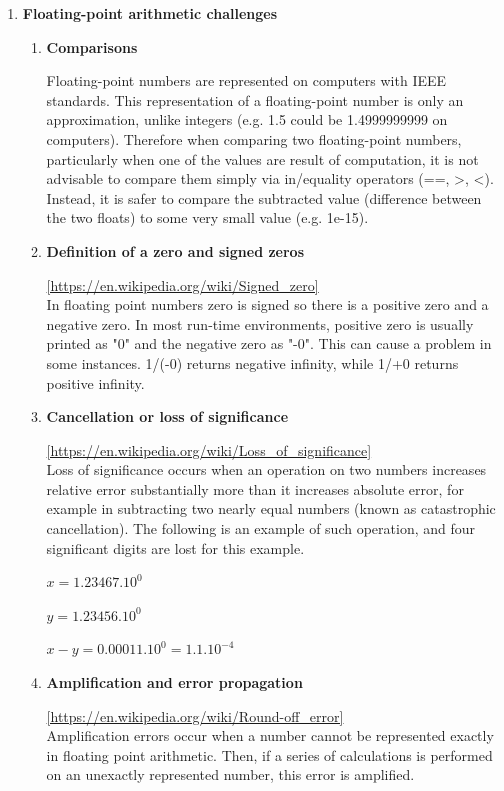 \documentclass[10pt, letterpaper, twoside]{article}
\begin{document}
\begin{titlepage}
\begin{enumerate}
\item \textbf{Floating-point arithmetic challenges} 

\begin{enumerate}

\item \textbf{Comparisons} 

Floating-point numbers are represented on computers with IEEE standards. This representation of a floating-point number is only an approximation, unlike integers (e.g. 1.5 could be 1.4999999999 on computers). Therefore when comparing two floating-point numbers, particularly when one of the values are result of computation, it is not advisable to compare them simply via in/equality operators (==, \textgreater , \textless ). Instead, it is safer to compare the subtracted value (difference between the two floats) to some very small value (e.g. 1e-15). \\

\item \textbf{Definition of a zero and signed zeros} 

\url{[https://en.wikipedia.org/wiki/Signed_zero]} \\
In floating point numbers zero is signed so there is a positive zero and a negative zero. In most run-time environments, positive zero is usually printed as "0" and the negative zero as "-0". This can cause a problem in some instances. 1/(-0) returns negative infinity, while 1/+0 returns positive infinity. \\

\item \textbf{Cancellation or loss of significance} 

\url{[https://en.wikipedia.org/wiki/Loss_of_significance]} \\
Loss of significance occurs when an operation on two numbers increases relative error substantially more than it increases absolute error, for example in subtracting two nearly equal numbers (known as catastrophic cancellation). The following is an example of such operation, and four significant digits are lost for this example. 

$x = 1.23467 . 10^0 $ 

$y = 1.23456 . 10^0 $  

$x - y = 0.00011 . 10^0 = 1.1 . 10^{-4} $ \\

\item \textbf{Amplification and error propagation} 

\url{[https://en.wikipedia.org/wiki/Round-off_error]} \\
Amplification errors occur when a number cannot be represented exactly in floating point arithmetic. Then, if a series of calculations is performed on an unexactly represented number, this error is amplified. \\


\end{enumerate}
\end{enumerate}
\end{titlepage}
\end{document}
